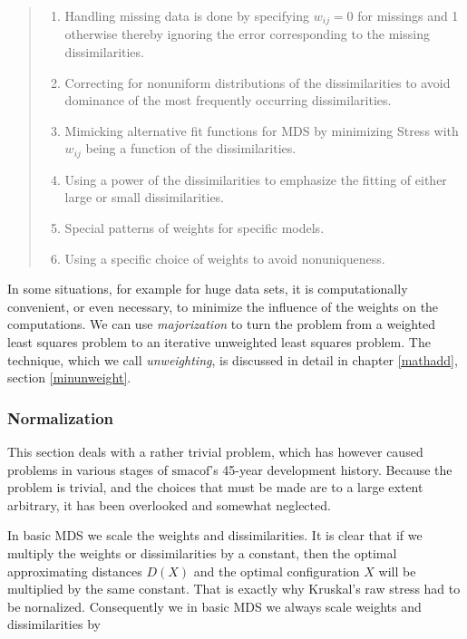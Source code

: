 \documentclass[
  12pt,
]{book}
\providecommand{\tightlist}{%
  \setlength{\itemsep}{0pt}\setlength{\parskip}{0pt}}
\theoremstyle{definition}
\theoremstyle{definition}
\theoremstyle{definition}
\theoremstyle{definition}
\theoremstyle{remark}
\begin{document}
\begin{quote}
\begin{enumerate}
\def\labelenumi{\arabic{enumi}.}
\tightlist
\item
  Handling missing data is done by specifying \(w_{ij} = 0\) for missings and 1 otherwise thereby ignoring the error corresponding to the missing dissimilarities.
\item
  Correcting for nonuniform distributions of the dissimilarities to avoid dominance of the most frequently occurring dissimilarities.
\item
  Mimicking alternative fit functions for MDS by minimizing Stress with \(w_{ij}\) being a function of the dissimilarities.
\item
  Using a power of the dissimilarities to emphasize the ﬁtting of either large or small dissimilarities.
\item
  Special patterns of weights for speciﬁc models.
\item
  Using a speciﬁc choice of weights to avoid nonuniqueness.
\end{enumerate}
\end{quote}

In some situations, for example for huge data sets, it is computationally convenient, or even necessary, to minimize the influence of the weights on the computations. We can use \emph{majorization} to turn the problem from a weighted least squares problem to an iterative unweighted least squares problem. The technique, which we call \emph{unweighting}, is discussed in detail in chapter \ref{mathadd}, section \ref{minunweight}.

\hypertarget{intronorm}{%
\subsubsection{Normalization}\label{intronorm}}

This section deals with a rather trivial problem, which has however caused problems in various stages of \(\textrm{smacof}\)'s 45-year development history. Because the problem is trivial, and the choices that must be made are to a large extent arbitrary, it has been overlooked and somewhat neglected.

In basic MDS we scale the weights and dissimilarities. It is clear that if we multiply the weights or dissimilarities by a constant, then the optimal approximating distances \(D(X)\) and the optimal configuration \(X\) will be multiplied by the same constant. That is exactly why Kruskal's raw stress had to be nornalized. Consequently we in basic MDS we always scale weights and dissimilarities by
\end{document}

